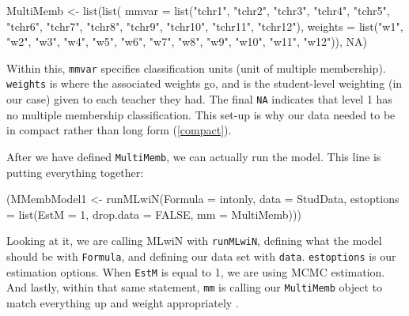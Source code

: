 \documentclass[
]{book}
\newenvironment{Shaded}{\begin{snugshade}}{\end{snugshade}}
\newcommand{\AttributeTok}[1]{\textcolor[rgb]{0.77,0.63,0.00}{#1}}
\newcommand{\ConstantTok}[1]{\textcolor[rgb]{0.00,0.00,0.00}{#1}}
\newcommand{\DecValTok}[1]{\textcolor[rgb]{0.00,0.00,0.81}{#1}}
\newcommand{\FunctionTok}[1]{\textcolor[rgb]{0.00,0.00,0.00}{#1}}
\newcommand{\NormalTok}[1]{#1}
\newcommand{\OtherTok}[1]{\textcolor[rgb]{0.56,0.35,0.01}{#1}}
\newcommand{\StringTok}[1]{\textcolor[rgb]{0.31,0.60,0.02}{#1}}
\begin{document}
\begin{Shaded}
\begin{Highlighting}[]
\NormalTok{MultiMemb }\OtherTok{\textless{}{-}} \FunctionTok{list}\NormalTok{(}\FunctionTok{list}\NormalTok{(}
  \AttributeTok{mmvar =} \FunctionTok{list}\NormalTok{(}\StringTok{"tchr1"}\NormalTok{, }\StringTok{"tchr2"}\NormalTok{, }\StringTok{"tchr3"}\NormalTok{, }\StringTok{"tchr4"}\NormalTok{, }\StringTok{"tchr5"}\NormalTok{, }\StringTok{"tchr6"}\NormalTok{, }\StringTok{"tchr7"}\NormalTok{, }\StringTok{"tchr8"}\NormalTok{, }\StringTok{"tchr9"}\NormalTok{, }\StringTok{"tchr10"}\NormalTok{, }\StringTok{"tchr11"}\NormalTok{, }\StringTok{"tchr12"}\NormalTok{),}
  \AttributeTok{weights =} \FunctionTok{list}\NormalTok{(}\StringTok{"w1"}\NormalTok{, }\StringTok{"w2"}\NormalTok{, }\StringTok{"w3"}\NormalTok{, }\StringTok{"w4"}\NormalTok{, }\StringTok{"w5"}\NormalTok{, }\StringTok{"w6"}\NormalTok{, }\StringTok{"w7"}\NormalTok{, }\StringTok{"w8"}\NormalTok{, }\StringTok{"w9"}\NormalTok{, }\StringTok{"w10"}\NormalTok{, }\StringTok{"w11"}\NormalTok{, }\StringTok{"w12"}\NormalTok{)), }\ConstantTok{NA}\NormalTok{)}
\end{Highlighting}
\end{Shaded}

Within this, \texttt{mmvar} specifies classification units (unit of multiple membership). \texttt{weights} is where the associated weights go, and is the student-level weighting (in our case) given to each teacher they had. The final \texttt{NA} indicates that level 1 has no multiple membership classification. This set-up is why our data needed to be in compact rather than long form (\ref{compact}).

After we have defined \texttt{MultiMemb}, we can actually run the model. This line is putting everything together:

\begin{Shaded}
\begin{Highlighting}[]
\NormalTok{(MMembModel1 }\OtherTok{\textless{}{-}} \FunctionTok{runMLwiN}\NormalTok{(}\AttributeTok{Formula =}\NormalTok{ intonly, }\AttributeTok{data =}\NormalTok{ StudData, }\AttributeTok{estoptions =} \FunctionTok{list}\NormalTok{(}\AttributeTok{EstM =} \DecValTok{1}\NormalTok{, }\AttributeTok{drop.data =} \ConstantTok{FALSE}\NormalTok{, }\AttributeTok{mm =}\NormalTok{ MultiMemb)))}
\end{Highlighting}
\end{Shaded}

Looking at it, we are calling MLwiN with \texttt{runMLwiN}, defining what the model should be with \texttt{Formula}, and defining our data set with \texttt{data}. \texttt{estoptions} is our estimation options. When \texttt{EstM} is equal to 1, we are using MCMC estimation. And lastly, within that same statement, \texttt{mm} is calling our \texttt{MultiMemb} object to match everything up and weight appropriately \citep{R-R2MLwiN}.
\end{document}
